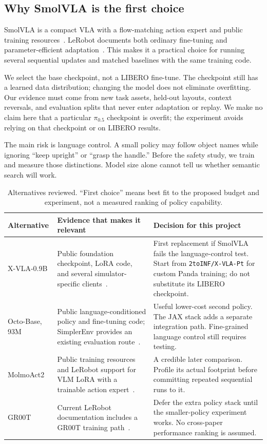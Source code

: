 \documentclass[11pt]{article}
\begin{document}
\subsection{Why SmolVLA is the first choice}

SmolVLA is a compact VLA with a flow-matching action expert and public training resources~\cite{smolvla}. LeRobot documents both ordinary fine-tuning and parameter-efficient adaptation~\cite{smoldocs,peft}. This makes it a practical choice for running several sequential updates and matched baselines with the same training code.

We select the base checkpoint, not a LIBERO fine-tune. The checkpoint still has a learned data distribution; changing the model does not eliminate overfitting. Our evidence must come from new task assets, held-out layouts, context reversals, and evaluation splits that never enter adaptation or replay. We make no claim here that a particular $\pi_{0.5}$ checkpoint is overfit; the experiment avoids relying on that checkpoint or on LIBERO results.

The main risk is language control. A small policy may follow object names while ignoring ``keep upright'' or ``grasp the handle.'' Before the safety study, we train and measure those distinctions. Model size alone cannot tell us whether semantic search will work.

\begin{table}[htbp]
\centering\small
\begin{tabularx}{\textwidth}{@{}p{}Y Y@{}}
\toprule
Alternative & Evidence that makes it relevant & Decision for this project \\
\midrule
X-VLA-0.9B & Public foundation checkpoint, LoRA code, and several simulator-specific clients~\cite{xvla}. & First replacement if SmolVLA fails the language-control test. Start from \texttt{2toINF/X-VLA-Pt} for custom Panda training; do not substitute its LIBERO checkpoint. \\
Octo-Base, 93M & Public language-conditioned policy and fine-tuning code; SimplerEnv provides an existing evaluation route~\cite{octo,simpler}. & Useful lower-cost second policy. The JAX stack adds a separate integration path. Fine-grained language control still requires testing. \\
MolmoAct2 & Public training resources and LeRobot support for VLM LoRA with a trainable action expert~\cite{molmo,molmodocs}. & A credible later comparison. Profile its actual footprint before committing repeated sequential runs to it. \\
GR00T & Current LeRobot documentation includes a GR00T training path~\cite{groot}. & Defer the extra policy stack until the smaller-policy experiment works. No cross-paper performance ranking is assumed. \\
\bottomrule
\end{tabularx}
\caption{Alternatives reviewed. ``First choice'' means best fit to the proposed budget and experiment, not a measured ranking of policy capability.}
\end{table}
\end{document}
